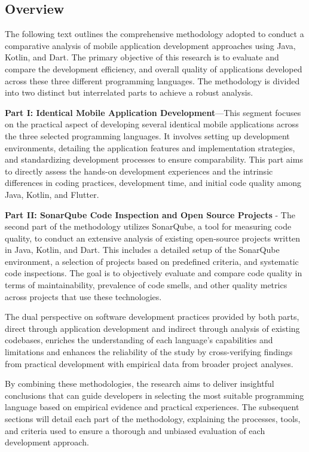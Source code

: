 \subsection{Overview}
The following text outlines the comprehensive methodology adopted to conduct a comparative analysis of mobile application development approaches using Java, Kotlin, and Dart. The primary objective of this research is to evaluate and compare the development efficiency, and overall quality of applications developed across these three different programming languages. The methodology is divided into two distinct but interrelated parts to achieve a robust analysis.
\par
\textbf{Part I: Identical Mobile Application Development}—This segment focuses on the practical aspect of developing several identical mobile applications across the three selected programming languages. It involves setting up development environments, detailing the application features and implementation strategies, and standardizing development processes to ensure comparability. This part aims to directly assess the hands-on development experiences and the intrinsic differences in coding practices, development time, and initial code quality among Java, Kotlin, and Flutter.
\par
\textbf{Part II: SonarQube Code Inspection and Open Source Projects} - The second part of the methodology utilizes SonarQube, a tool for measuring code quality, to conduct an extensive analysis of existing open-source projects written in Java, Kotlin, and Dart. This includes a detailed setup of the SonarQube environment, a selection of projects based on predefined criteria, and systematic code inspections. The goal is to objectively evaluate and compare code quality in terms of maintainability, prevalence of code smells, and other quality metrics across projects that use these technologies.
\par
The dual perspective on software development practices provided by both parts, direct through application development and indirect through analysis of existing codebases, enriches the understanding of each language's capabilities and limitations and enhances the reliability of the study by cross-verifying findings from practical development with empirical data from broader project analyses.
\par
By combining these methodologies, the research aims to deliver insightful conclusions that can guide developers in selecting the most suitable programming language based on empirical evidence and practical experiences. The subsequent sections will detail each part of the methodology, explaining the processes, tools, and criteria used to ensure a thorough and unbiased evaluation of each development approach.

